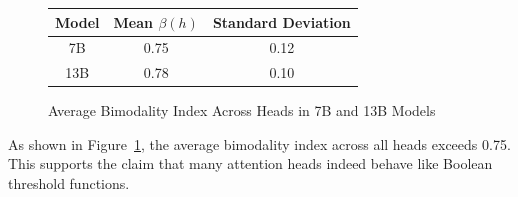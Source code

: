 \begin{figure}[htbp]






\centering






\begin{tabular}{|c|c|c|}






\hline






Model & Mean $\beta(h)$ & Standard Deviation \\






\hline






7B & 0.75 & 0.12 \\






13B & 0.78 & 0.10 \\






\hline






\end{tabular}






\caption{Average Bimodality Index Across Heads in 7B and 13B Models}






\label{fig:bimodality}






\end{figure}













As shown in Figure~\ref{fig:bimodality}, the average bimodality index across all heads exceeds 0.75. This supports the claim that many attention heads indeed behave like Boolean threshold functions.













